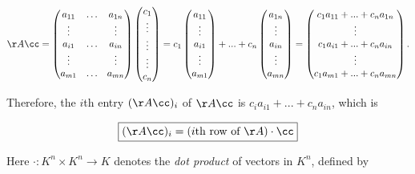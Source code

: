 \begin{theorem}
    \begin{align*}
            \AA \cc = 
            \begin{pmatrix}
                a_{11} & \hdots & a_{1n} \\
                \vdots & & \vdots \\
                a_{i1} & \hdots & a_{in} \\
                \vdots & & \vdots \\
                a_{m1} & \hdots & a_{mn}
            \end{pmatrix}
            \begin{pmatrix} c_1 \\ \vdots \\ \vdots \\ \vdots \\ c_n \end{pmatrix}
            =
            c_1
            \begin{pmatrix} a_{11} \\ \vdots \\ a_{i1} \\ \vdots \\ a_{m1} \end{pmatrix}
            +
            ...
            +
            c_n
            \begin{pmatrix} a_{1n} \\ \vdots \\ a_{in} \\ \vdots \\ a_{mn} \end{pmatrix}
            =
            \begin{pmatrix} c_1 a_{11} + ... + c_n a_{1n} \\ \vdots \\ c_1 a_{i1} + ... + c_n a_{in} \\ \vdots \\ c_1 a_{m1} + ... + c_n a_{mn} \end{pmatrix}.
    \end{align*}

    Therefore, the $i$th entry $(\AA \cc)_i$ of $\AA \cc$ is $c_i a_{i1} + ... + c_n a_{in} $, which is
    
    \begin{align*}
        \boxed
        {
            (\AA \cc)_i = (\text{$i$th row of $\AA$}) \cdot \cc
        }
    \end{align*}
    
    Here $\cdot:K^n \times K^n \rightarrow K$ denotes the \textit{dot product} of vectors in $K^n$, defined by
    

\end{theorem}
